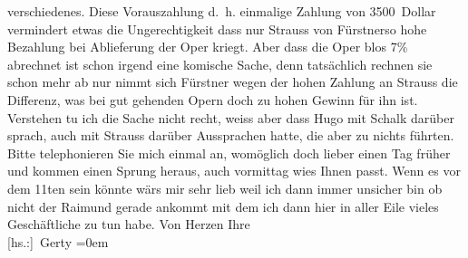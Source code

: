 \begin{ledgroupsized}[t]{13cm}
               verschiedenes. Diese Vorauszahlung d. h. einmalige Zahlung von 3500 Dollar vermindert
               etwas die Ungerechtigkeit dass nur Strauss von
                  Fürstnerso hohe Bezahlung bei Ablieferung der Oper kriegt.
               Aber dass die Oper blos 7{\%} abrechnet ist schon irgend eine
               komische Sache, denn tatsächlich rechnen sie schon mehr ab nur nimmt sich Fürstner wegen der hohen Zahlung an Strauss die Differenz, was bei gut gehenden
               Opern doch zu hohen Gewinn für ihn ist. Verstehen tu ich die Sache nicht recht, weiss
               aber dass Hugo mit Schalk darüber sprach, auch mit Strauss darüber Aussprachen hatte, die aber zu nichts
               führten.\pend
           \pstart
           Bitte telephonieren Sie mich einmal an, womöglich doch lieber einen Tag früher und
               kommen einen Sprung heraus, auch vormittag wies Ihnen passt.\pend
           \pstart
           Wenn es vor dem 11ten{ }sein könnte wärs mir sehr lieb weil ich dann immer
               unsicher bin ob nicht der Raimund gerade
               ankommt mit dem ich dann hier in aller Eile vieles Geschäftliche zu tun habe.\pend
           \pstart
           Von Herzen Ihre{\\[\baselineskip]}\spacefill\mbox{{[}hs.:{]} Gerty}\pend
           \leftskip=0em{}
         
         \endnumbering{}\end{ledgroupsized}  \newcommand{\dateiname}{L02544}\newcommand{\titel}{Gerty von Hofmannsthal an Arthur Schnitzler, [5. 3. 1931]}\newcommand{\editorInnen}{Martin Anton Müller und Gerd-Hermann Susen}
      